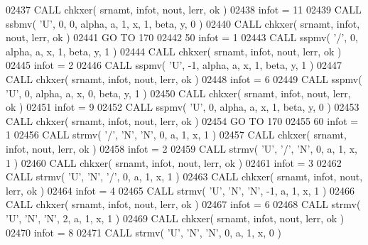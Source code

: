 \begin{DoxyCode}
02437       \textcolor{keyword}{CALL }chkxer( srnamt, infot, nout, lerr, ok )
02438       infot = 11
02439       \textcolor{keyword}{CALL }ssbmv( \textcolor{stringliteral}{'U'}, 0, 0, alpha, a, 1, x, 1, beta, y, 0 )
02440       \textcolor{keyword}{CALL }chkxer( srnamt, infot, nout, lerr, ok )
02441       \textcolor{keywordflow}{GO TO} 170
02442    50 infot = 1
02443       \textcolor{keyword}{CALL }sspmv( \textcolor{stringliteral}{'/'}, 0, alpha, a, x, 1, beta, y, 1 )
02444       \textcolor{keyword}{CALL }chkxer( srnamt, infot, nout, lerr, ok )
02445       infot = 2
02446       \textcolor{keyword}{CALL }sspmv( \textcolor{stringliteral}{'U'}, -1, alpha, a, x, 1, beta, y, 1 )
02447       \textcolor{keyword}{CALL }chkxer( srnamt, infot, nout, lerr, ok )
02448       infot = 6
02449       \textcolor{keyword}{CALL }sspmv( \textcolor{stringliteral}{'U'}, 0, alpha, a, x, 0, beta, y, 1 )
02450       \textcolor{keyword}{CALL }chkxer( srnamt, infot, nout, lerr, ok )
02451       infot = 9
02452       \textcolor{keyword}{CALL }sspmv( \textcolor{stringliteral}{'U'}, 0, alpha, a, x, 1, beta, y, 0 )
02453       \textcolor{keyword}{CALL }chkxer( srnamt, infot, nout, lerr, ok )
02454       \textcolor{keywordflow}{GO TO} 170
02455    60 infot = 1
02456       \textcolor{keyword}{CALL }strmv( \textcolor{stringliteral}{'/'}, \textcolor{stringliteral}{'N'}, \textcolor{stringliteral}{'N'}, 0, a, 1, x, 1 )
02457       \textcolor{keyword}{CALL }chkxer( srnamt, infot, nout, lerr, ok )
02458       infot = 2
02459       \textcolor{keyword}{CALL }strmv( \textcolor{stringliteral}{'U'}, \textcolor{stringliteral}{'/'}, \textcolor{stringliteral}{'N'}, 0, a, 1, x, 1 )
02460       \textcolor{keyword}{CALL }chkxer( srnamt, infot, nout, lerr, ok )
02461       infot = 3
02462       \textcolor{keyword}{CALL }strmv( \textcolor{stringliteral}{'U'}, \textcolor{stringliteral}{'N'}, \textcolor{stringliteral}{'/'}, 0, a, 1, x, 1 )
02463       \textcolor{keyword}{CALL }chkxer( srnamt, infot, nout, lerr, ok )
02464       infot = 4
02465       \textcolor{keyword}{CALL }strmv( \textcolor{stringliteral}{'U'}, \textcolor{stringliteral}{'N'}, \textcolor{stringliteral}{'N'}, -1, a, 1, x, 1 )
02466       \textcolor{keyword}{CALL }chkxer( srnamt, infot, nout, lerr, ok )
02467       infot = 6
02468       \textcolor{keyword}{CALL }strmv( \textcolor{stringliteral}{'U'}, \textcolor{stringliteral}{'N'}, \textcolor{stringliteral}{'N'}, 2, a, 1, x, 1 )
02469       \textcolor{keyword}{CALL }chkxer( srnamt, infot, nout, lerr, ok )
02470       infot = 8
02471       \textcolor{keyword}{CALL }strmv( \textcolor{stringliteral}{'U'}, \textcolor{stringliteral}{'N'}, \textcolor{stringliteral}{'N'}, 0, a, 1, x, 0 )

\end{DoxyCode}
